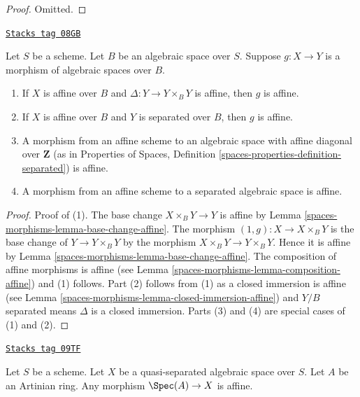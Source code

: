 \begin{proof}
Omitted.
\end{proof}

\begin{lemma}
\label{spaces-morphisms-lemma-affine-permanence}
\href{https://stacks.math.columbia.edu/tag/08GB}{\texttt{Stacks tag 08GB}}

Let $S$ be a scheme. Let $B$ be an algebraic space over $S$.
Suppose $g : X \to Y$ is a morphism of algebraic spaces over $B$.
\begin{enumerate}
\item If $X$ is affine over $B$ and $\Delta : Y \to Y \times_B Y$ is affine,
then $g$ is affine.
\item If $X$ is affine over $B$ and $Y$ is separated over $B$,
then $g$ is affine.
\item A morphism from an affine scheme to an algebraic space with affine
diagonal over $\mathbf{Z}$ (as in Properties of Spaces, Definition
\ref{spaces-properties-definition-separated}) is affine.
\item A morphism from an affine scheme to a separated algebraic space
is affine.
\end{enumerate}
\end{lemma}

\begin{proof}
Proof of (1). The base change $X \times_B Y \to Y$ is affine by
Lemma \ref{spaces-morphisms-lemma-base-change-affine}.
The morphism $(1, g) : X \to X \times_B Y$ is the base change of
$Y \to Y \times_B Y$ by the morphism $X \times_B Y \to Y \times_B Y$.
Hence it is affine by
Lemma \ref{spaces-morphisms-lemma-base-change-affine}.
The composition of affine morphisms is affine
(see Lemma \ref{spaces-morphisms-lemma-composition-affine}) and (1) follows.
Part (2) follows from (1) as a closed immersion is affine
(see Lemma \ref{spaces-morphisms-lemma-closed-immersion-affine}) and $Y/B$ separated
means $\Delta$ is a closed immersion. Parts (3) and (4) are special
cases of (1) and (2).
\end{proof}

\begin{lemma}
\label{spaces-morphisms-lemma-Artinian-affine}
\href{https://stacks.math.columbia.edu/tag/09TF}{\texttt{Stacks tag 09TF}}

Let $S$ be a scheme. Let $X$ be a quasi-separated algebraic space over $S$.
Let $A$ be an Artinian ring. Any morphism $\Spec(A) \to X$ is affine.
\end{lemma}


